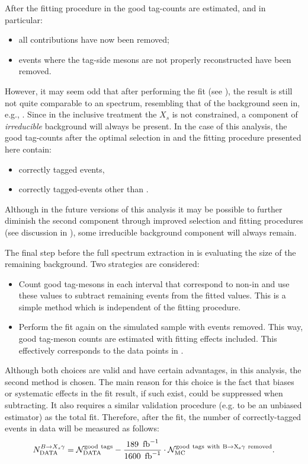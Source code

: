 After the fitting procedure in  the good tag-\B counts are estimated, and in particular:
\begin{itemize}
    \item all \epem\ra\qqbar contributions have now been removed;
    \item events where the tag-side \B mesons are not properly reconstructed have been removed.
\end{itemize}

However, it may seem odd that after performing the \Mbc fit (see ), the result is still not quite comparable to an \EB spectrum,
resembling that of the background seen in, e.g., .
Since in the inclusive treatment the $X_s$ is not constrained, a component of \textit{irreducible} background will always be present.
In the case of this analysis, the good tag-\B counts after the optimal selection in  and the fitting procedure presented here contain:
\begin{itemize}
    \item correctly tagged \BtoXsgamma events,
    \item correctly tagged-\BB events other than \BtoXsgamma.
\end{itemize}
Although in the future versions of this analysis it may be possible to further diminish the second component through improved selection and fitting procedures (see discussion in ), 
some irreducible background component will always remain.

The final step before the full \BtoXsgamma spectrum extraction in \MC is evaluating the size of the remaining \BB background.
Two strategies are considered:
\begin{itemize}
    \item Count good tag-\B mesons in each \EB interval that correspond to non-\BtoXsgamma in \MC and use these values to subtract remaining \BB events from the fitted values.
    This is a simple method which is independent of the fitting procedure.
    \item Perform the fit again on the simulated sample with \BtoXsgamma events removed.
    This way, good tag-\B meson counts are estimated with fitting effects included.
    This effectively corresponds to the data points in .
\end{itemize}
Although both choices are valid and have certain advantages, in this analysis, the second method is chosen.
The main reason for this choice is the fact that biases or systematic effects in the fit result, if such exist, could be suppressed when subtracting.
It also requires a similar validation procedure (e.g. to be an unbiased estimator) as the total fit.
Therefore, after the \Mbc fit, the number of correctly-tagged \BtoXsgamma events in data will be measured as follows:
\begin{equation}\label{eq:background_subtraction}
    N_{\mathrm{DATA}}^{\BtoXsgamma} = \mathcal{N}_{\mathrm{DATA}}^{\mathrm{good~tags}}  - \frac{189~\invfb}{1600~\invfb}\cdot \mathcal{N}_{\mathrm{MC}}^{\mathrm{good~tags~with~\BtoXsgamma~removed}}.
\end{equation}